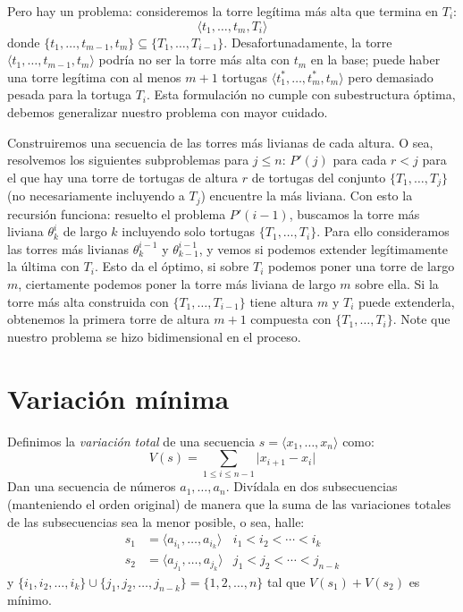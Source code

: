   Pero hay un problema:
  consideremos la torre legítima más alta que termina en \(T_i\):
  \begin{equation*}
    \langle t_1, \dotsc, t_m, T_i \rangle
  \end{equation*}
  donde
    \(\{ t_1, \dotsc, t_{m - 1}, t_m \} \subseteq \{ T_1, \dotsc, T_{i - 1} \}\).
  Desafortunadamente,
  la torre \(\langle t_1, \dotsc, t_{m - 1}, t_m \rangle\)
  podría no ser la torre más alta con \(t_m\) en la base;
  puede haber una torre legítima con al menos \(m + 1\) tortugas
  \(\langle t_1^*, \dotsc, t_m^*, t_m \rangle\)
  pero demasiado pesada para la tortuga \(T_i\).
  Esta formulación no cumple con subestructura óptima,
  debemos generalizar nuestro problema con mayor cuidado.

  Construiremos una secuencia de las torres más livianas de cada altura.
  O sea,
  resolvemos los siguientes subproblemas para \(j \le n\):
  \(P'(j)\) para cada \(r < j\) para el que hay una torre de tortugas
  de altura \(r\) de tortugas del conjunto \(\{ T_1, \dotsc, T_j \}\)
  (no necesariamente incluyendo a \(T_j\))
  encuentre la más liviana.
  Con esto la recursión funciona:
  resuelto el problema \(P'(i - 1)\),
  buscamos la torre más liviana \(\theta_k^i\) de largo \(k\)
  incluyendo solo tortugas \(\{ T_1, \dotsc, T_i\} \).
  Para ello consideramos las torres más livianas \(\theta_k^{i - 1}\)
  y \(\theta_{k - 1}^{i - 1}\),
  y vemos si podemos extender legítimamente la última con \(T_i\).
  Esto da el óptimo,
  si sobre \(T_i\) podemos poner una torre de largo \(m\),
  ciertamente podemos poner la torre más liviana de largo \(m\) sobre ella.
  Si la torre más alta construida con \(\{ T_1, \dotsc, T_{i - 1} \}\)
  tiene altura \(m\) y \(T_i\) puede extenderla,
  obtenemos la primera torre de altura \(m + 1\)
  compuesta con \(\{ T_1, \dotsc, T_i \}\).
  Note que nuestro problema se hizo bidimensional en el proceso.

\section{Variación mínima}
\label{sec:variacion-minima}

  Definimos la \emph{variación total} de una secuencia
  \(s = \langle x_1, \dotsc, x_n \rangle\)
  como:
  \begin{equation*}
    V(s)
      = \sum_{1 \le i \le n - 1} \lvert x_{i + 1} - x_i \lvert
  \end{equation*}
  Dan una secuencia de números \(a_1, \dotsc, a_n\).
  Divídala en dos subsecuencias
  (manteniendo el orden original)
  de manera que la suma de las variaciones totales de las subsecuencias
  sea la menor posible,
  o sea,
  halle:
  \begin{align*}
    s_1
      &= \langle a_{i_1}, \dotsc, a_{i_k} \rangle
        & i_1 < i_2 < \dotsm < i_k \\
    s_2
      &= \langle a_{j_1}, \dotsc, a_{j_k} \rangle
        & j_1 < j_2 < \dotsm < j_{n -k}
  \end{align*}
  y \(\{ i_1, i_2, \dotsc, i_k \} \cup \{ j_1, j_2, \dotsc, j_{n - k} \}
          = \{1, 2, \dotsc, n \}\)
  tal que \(V(s_1) + V(s_2)\) es mínimo.

